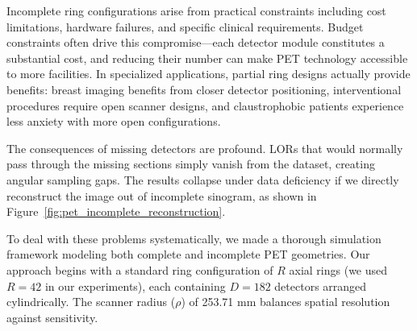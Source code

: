 \documentclass[aps,prb,preprint,groupedaddress,showkeys]{revtex4}
\begin{document}






Incomplete ring configurations arise from practical constraints including cost limitations, hardware failures, and specific clinical requirements. Budget constraints often drive this compromise—each detector module constitutes a substantial cost, and reducing their number can make PET technology accessible to more facilities. In specialized applications, partial ring designs actually provide benefits: breast imaging benefits from closer detector positioning, interventional procedures require open scanner designs, and claustrophobic patients experience less anxiety with more open configurations.





The consequences of missing detectors are profound. 
LORs that would normally pass through the missing sections simply vanish from the dataset, creating angular sampling gaps. The results collapse under data deficiency if we directly reconstruct the image out of incomplete sinogram, as shown in Figure~\ref{fig:pet_incomplete_reconstruction}.


To deal with these problems systematically, we made a thorough simulation framework modeling both complete and incomplete PET geometries. Our approach begins with a standard ring configuration of $R$ axial rings (we used $R=42$ in our experiments), each containing $D=182$ detectors arranged cylindrically. The scanner radius ($\rho$) of 253.71 mm balances spatial resolution against sensitivity.
\end{document}
